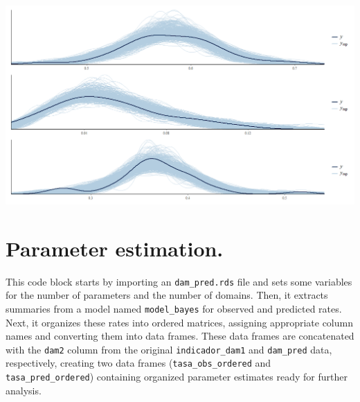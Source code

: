 \documentclass[
  12pt,
]{book}
\begin{document}
\includegraphics{Recursos/05_Empleo/10_ppc.png}

\hypertarget{parameter-estimation.}{%
\section{Parameter estimation.}\label{parameter-estimation.}}

This code block starts by importing an \texttt{dam\_pred.rds} file and sets some variables for the number of parameters and the number of domains. Then, it extracts summaries from a model named \texttt{model\_bayes} for observed and predicted rates. Next, it organizes these rates into ordered matrices, assigning appropriate column names and converting them into data frames. These data frames are concatenated with the \texttt{dam2} column from the original \texttt{indicador\_dam1} and \texttt{dam\_pred} data, respectively, creating two data frames (\texttt{tasa\_obs\_ordered} and \texttt{tasa\_pred\_ordered}) containing organized parameter estimates ready for further analysis.
\end{document}

